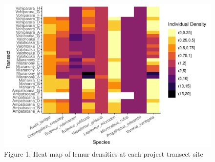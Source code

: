 \documentclass[
  12pt,
]{article}
\begin{document}
\begin{figure}
\centering
\includegraphics{project_draft_files/figure-latex/unnamed-chunk-1-1.pdf}
\caption{Figure 1. Heat map of lemur densities at each project transect
site}
\end{figure}
\end{document}
